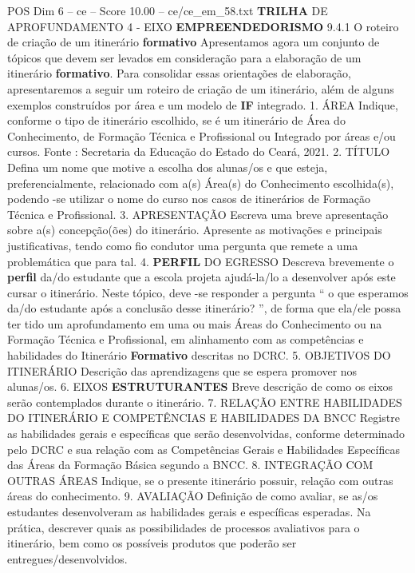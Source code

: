 \begin{textsample}{POS Dim 6 – ce – Score 10.00 – ce/ce\_em\_58.txt}  \label{ex:f6_pos_036}
\textbf{TRILHA} DE APROFUNDAMENTO 4 - EIXO \textbf{EMPREENDEDORISMO} 9.4.1 O roteiro de criação de um itinerário \textbf{formativo} Apresentamos agora um conjunto de tópicos que devem ser levados em consideração para a elaboração de um itinerário \textbf{formativo}.
Para consolidar essas orientações de elaboração, apresentaremos a seguir um roteiro de criação de um itinerário, além de alguns exemplos construídos por área e um modelo de \textbf{IF} integrado. 1.
ÁREA Indique, conforme o tipo de itinerário escolhido, se é um itinerário de Área do Conhecimento, de Formação Técnica e Profissional ou Integrado por áreas e/ou cursos.
Fonte : Secretaria da Educação do Estado do Ceará, 2021. 2.
TÍTULO Defina um nome que motive a escolha dos alunas/os e que esteja, preferencialmente, relacionado com a(s) Área(s) do Conhecimento escolhida(s), podendo -se utilizar o nome do curso nos casos de itinerários de Formação Técnica e Profissional. 3.
APRESENTAÇÃO Escreva uma breve apresentação sobre a(s) concepção(ões) do itinerário.
Apresente as motivações e principais justificativas, tendo como fio condutor uma pergunta que remete a uma problemática que para tal. 4. \textbf{PERFIL} DO EGRESSO Descreva brevemente o \textbf{perfil} da/do estudante que a escola projeta ajudá-la/lo a desenvolver após este cursar o itinerário.
Neste tópico, deve -se responder a pergunta “ o que esperamos da/do estudante após a conclusão desse itinerário? ”, de forma que ela/ele possa ter tido um aprofundamento em uma ou mais Áreas do Conhecimento ou na Formação Técnica e Profissional, em alinhamento com as competências e habilidades do Itinerário \textbf{Formativo} descritas no DCRC. 5.
OBJETIVOS DO ITINERÁRIO Descrição das aprendizagens que se espera promover nos alunas/os. 6.
EIXOS \textbf{ESTRUTURANTES} Breve descrição de como os eixos serão contemplados durante o itinerário. 7.
RELAÇÃO ENTRE HABILIDADES DO ITINERÁRIO E COMPETÊNCIAS E HABILIDADES DA BNCC Registre as habilidades gerais e específicas que serão desenvolvidas, conforme determinado pelo DCRC e sua relação com as Competências Gerais e Habilidades Específicas das Áreas da Formação Básica segundo a BNCC. 8.
INTEGRAÇÃO COM OUTRAS ÁREAS Indique, se o presente itinerário possuir, relação com outras áreas do conhecimento. 9.
AVALIAÇÃO Definição de como avaliar, se as/os estudantes desenvolveram as habilidades gerais e específicas esperadas.
Na prática, descrever quais as possibilidades de processos avaliativos para o itinerário, bem como os possíveis produtos que poderão ser entregues/desenvolvidos.

\end{textsample}
